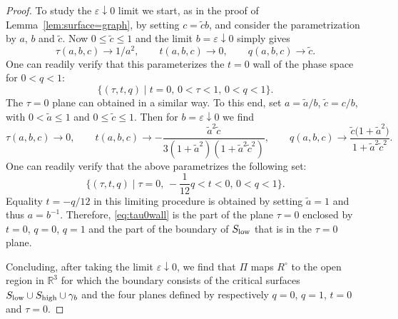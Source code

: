 \documentclass[10pt,a4paper]{amsart}
\newcommand{\eps}{\varepsilon}
\numberwithin{equation}{section}
\begin{document}
\begin{proof}
To study the $\eps \downarrow 0$ limit we start, as in the proof of Lemma~\ref{lem:surface=graph}, by setting
$c=\tilde c b$,
and consider the parametrization by $a$, $b$ and $\tilde c$. Now $0\leq \tilde c \leq 1$ and the limit $b= \eps\downarrow 0$ simply gives
\begin{equation*} %
 \tau(a,b,c)\to 1/a^2, \qquad t(a,b, c)\to 0,\qquad q(a,b,c) \to \tilde c.
\end{equation*}
 One can readily verify that this parameterizes the $t=0$ wall of the phase space for $0 < q < 1$:
 \begin{equation*} %
 \{(\tau,t,q)\mid t = 0,\, 0 < \tau < 1,\, 0 < q < 1\}.
 \end{equation*}
The $\tau=0$ plane can obtained in a similar way. To this end, set
$
 a=\tilde a/b$, $\tilde c=c/b$,
 with $0<\tilde a\leq 1$ and $0\leq \tilde c \leq 1$.
 Then for $b=\eps\downarrow 0$ we find
 \begin{equation*}
 \tau( a,b, c)\to 0,\qquad t( a,b, c) \to -\frac{\tilde a^2 \tilde c}{3(1+\tilde a^2)(1+\tilde a^2 \tilde c^2)},\qquad
 q( a,b, c) \to \frac{\tilde c\bigl(
 1+\tilde a^2\bigr)}{1+\tilde a^2\tilde c^2}.
 \end{equation*}
 One can readily verify that the above parametrizes the following set:
 \begin{equation} \label{eq:tau0wall}
 \biggl\{(\tau,t,q)\mid \tau = 0,\, -\frac{1}{12}q<t<0,\, 0 < q < 1\biggr\}.
 \end{equation}
 Equality $t=-q/12$ in this limiting procedure is obtained by setting $\tilde a=1$ and thus $a=b^{-1}$. Therefore, \eqref{eq:tau0wall} is the part of the plane $\tau=0$ enclosed by $t=0$, $q=0$, $q=1$ and the part of the boundary of $S_{{\rm low}}$ that is in the $\tau=0$ plane.



 Concluding, after taking the limit $\eps \downarrow 0$, we find that $\Pi$ maps $R^{\circ}$ to the open region in $\mathbb R^3$ for which the boundary consists of the critical surfaces $S_{{\rm low}} \cup S_{{\rm high}}\cup \gamma_b$ and the four planes defined by respectively $q=0$, $q=1$, $t=0$ and $\tau=0$.


\end{proof}
\end{document}
